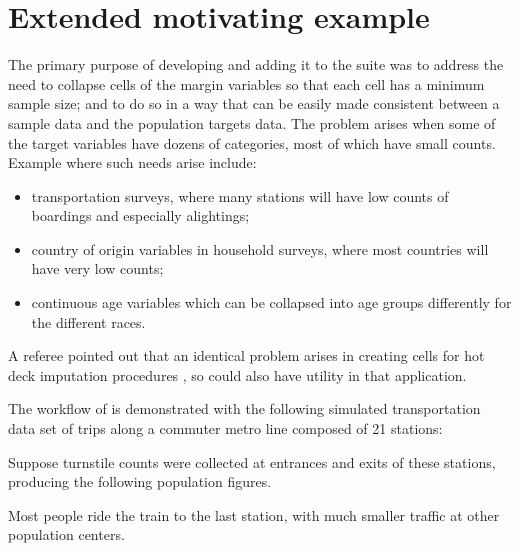 
\section{Extended motivating example}
\label{subsec:example}

The primary purpose of developing  and adding it to the 
suite was to address the need
to collapse cells of the margin variables so that each cell has a minimum sample size;
and to do so in a way that can be easily made consistent between a sample data
and the population targets data. The problem arises when some of the target
variables have dozens of categories, most of which have small counts.
Example where such needs arise include:
\begin{itemize}
    \item transportation surveys, where many stations will have
        low counts of boardings and especially alightings;
    \item country of origin variables in household surveys,
        where most countries will have very low counts;
    \item continuous age variables which can be collapsed into
        age groups differently for the different races.
\end{itemize}
A referee pointed out that an identical problem arises in creating cells
for hot deck imputation procedures \citet{andridge:little:2010}, 
so  could also have utility in that application.

The workflow of  is demonstrated with the following
simulated transportation data set of trips along a commuter metro line composed of 21 stations:

\begin{stlog}
\nullskip
\end{stlog}

Suppose turnstile counts were collected at entrances and exits of these stations,
producing the following population figures.

\cnp

\label{page:station:daypart}

\noindent
\begin{stlog}
\nullskip
\end{stlog}

Most people ride the train to the last station, with much smaller traffic at other population centers.


